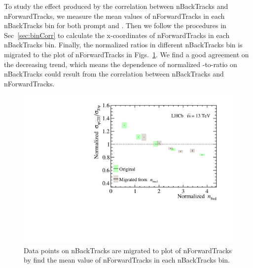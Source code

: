To study the effect produced by the correlation between nBackTracks and nForwardTracks, we measure the mean values of nForwardTracks in each nBackTracks bin for both prompt \jpsi and \psitwos. Then we follow the procedures in Sec~\ref{sec:binCorr} to calculate the x-coordinates of nForwardTracks in each nBackTracks bin. Finally, the normalized ratios in different nBackTracks bin is migrated to the plot of nForwardTracks in Figs.~\ref{BtoF}. We find a good agreement on the decreasing trend, which means the dependence of normalized \psitwos-to-\jpsi ratio on nBackTracks could result from the correlation between nBackTracks and nForwardTracks.
\begin{figure}[H] 
    \begin{center}
      \includegraphics[width=0.8\linewidth]{pdf/Result/AllBtoF.pdf}
    \end{center}
    \caption{ Data points on nBackTracks are migrated to plot of nForwardTracks by find the mean value of nForwardTracks in each nBackTracks bin.
      } 
    \label{BtoF}
\end{figure}
